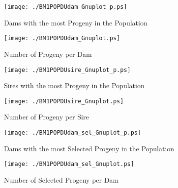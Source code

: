 
\begin{figure}[h]
\begin{center}{
\caption{Dams with the most Progeny in the Population}
  \texttt{[image: ./BM1POPDUdam\_Gnuplot\_p.ps]}
  }\end{center}
  \end{figure}
  

\begin{figure}[h]
\begin{center}{
\caption{Number of Progeny per Dam }
  \texttt{[image: ./BM1POPDUdam\_Gnuplot.ps]}
  }\end{center}
  \end{figure}
  

\begin{figure}[h]
\begin{center}{
\caption{Sires with the most Progeny in the Population}
  \texttt{[image: ./BM1POPDUsire\_Gnuplot\_p.ps]}
  }\end{center}
  \end{figure}
  

\begin{figure}[h]
\begin{center}{
\caption{Number of Progeny per Sire }
  \texttt{[image: ./BM1POPDUsire\_Gnuplot.ps]}
  }\end{center}
  \end{figure}
  

\begin{figure}[h]
\begin{center}{
\caption{Dams with the most Selected Progeny in the Population}
  \texttt{[image: ./BM1POPDUdam\_sel\_Gnuplot\_p.ps]}
  }\end{center}
  \end{figure}
  

\begin{figure}[h]
\begin{center}{
\caption{Number of Selected Progeny per Dam}
  \texttt{[image: ./BM1POPDUdam\_sel\_Gnuplot.ps]}
  }\end{center}
  \end{figure}
  

